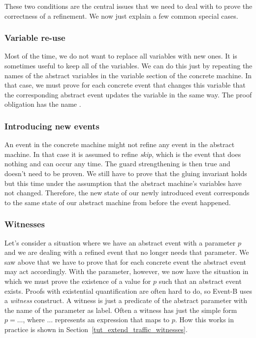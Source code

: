 These two conditions are the central issues that we need to deal with to prove the correctness of a refinement. We now just explain a few
common special cases.

\subsubsection{Variable re-use}
\label{tut_variable_reuse}
Most of the time, we do not want to replace all variables with new ones. It is sometimes useful to keep all of the variables.
We can do this just by repeating the names of the abstract variables in the variable section of the concrete
machine. In that case, we must prove for each concrete event that changes this variable that the corresponding 
abstract event updates the variable in the same way.
The proof obligation has the name .

\subsubsection{Introducing new events}
\label{tut_skip}
An event in the concrete machine might not refine any event in the abstract machine. In that case it is assumed
to refine \emph{skip}, which is the event that does nothing and can occur any time. 
The guard strengthening is then true and doesn't need to be proven.
We still have to prove that the gluing invariant holds but this time under the assumption that the abstract machine's
variables have not changed. Therefore, the new state of our newly introduced event corresponds to the same state of
our abstract machine from before the event happened.

\subsubsection{Witnesses}
\label{tut_witnesses}
Let's consider a situation where we have an abstract event with a parameter $p$ and we are dealing with a refined event that no longer needs that parameter.
We saw above that we have to prove that for each concrete event the abstract event may act accordingly.
With the parameter, however, we now have the situation in which we must prove the existence of a value for $p$ such
that an abstract event exists. Proofs with existential quantification are often hard to do, so Event-B 
uses a \emph{witness} construct. A witness is just a predicate of the abstract parameter with the
name of the parameter as label. Often a witness has just the simple form $p = \ldots$, where $\ldots$ represents an expression that maps to $p$.  How this works in practice is shown in Section~\ref{tut_extend_traffic_witnesses}.


